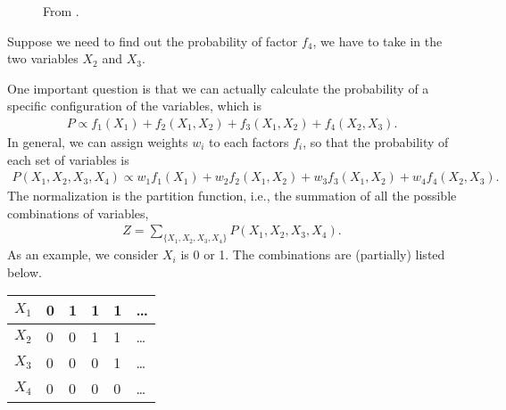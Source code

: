\documentclass[letterpaper,10pt,english]{sphinxmanual}
\begin{document}
\begin{figure}[htbp]
\centering
\capstart

\noindent{}
\caption{From .}\label{\detokenize{topics/factor-graph:id2}}\end{figure}

Suppose we need to find out the probability of factor \(f_4\), we have to take in the two variables \(X_2\) and \(X_3\).

One important question is that we can actually calculate the probability of a specific configuration of the variables, which is
\begin{equation*}
\begin{split}P \propto f_1(X_1) + f_2(X_1,X_2) + f_3(X_1,X_2) + f_4(X_2,X_3).\end{split}
\end{equation*}
In general, we can assign weights \(w_i\) to each factors \(f_i\), so that the probability of each set of variables is
\begin{equation*}
\begin{split}P(X_1,X_2,X_3,X_4) \propto w_1 f_1(X_1) + w_2 f_2(X_1,X_2) + w_3 f_3(X_1,X_2) + w_4 f_4(X_2,X_3).\end{split}
\end{equation*}
The normalization is the partition function, i.e., the summation of all the possible combinations of variables,
\begin{equation*}
\begin{split}Z = \sum_{\{X_1,X_2,X_3,X_4\}} P(X_1,X_2,X_3,X_4).\end{split}
\end{equation*}
As an example, we consider \(X_i\) is 0 or 1. The combinations are (partially) listed below.


\begin{savenotes}\sphinxattablestart
\centering
{}
\label{\detokenize{topics/factor-graph:id3}}
\sphinxaftercaption
\begin{tabulary}{\linewidth}[t]{|T|T|T|T|T|T|}
\hline

\(X_1\)
&
0
&
1
&
1
&
1
&
…
\\
\hline
\(X_2\)
&
0
&
0
&
1
&
1
&
…
\\
\hline
\(X_3\)
&
0
&
0
&
0
&
1
&
…
\\
\hline
\(X_4\)
&
0
&
0
&
0
&
0
&
…
\\
\hline
\end{tabulary}
\par
\sphinxattableend\end{savenotes}
\end{document}

